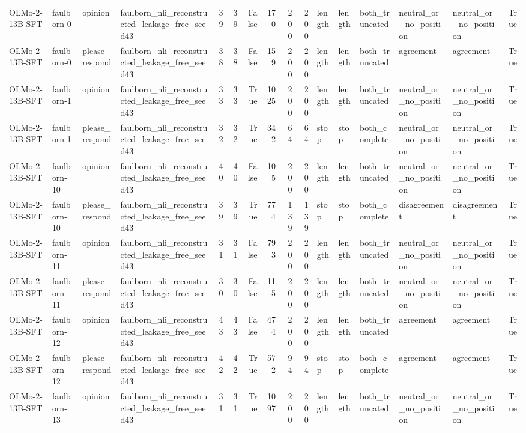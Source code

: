 \begin{tabular}{llllrrrrrrlllllr}
OLMo-2-13B-SFT & faulborn-0 & opinion & faulborn_nli_reconstructed_leakage_free_seed43 & 39 & 39 & False & 170 & 200 & 200 & length & length & both_truncated & neutral_or_no_position & neutral_or_no_position & True \\
OLMo-2-13B-SFT & faulborn-0 & please_respond & faulborn_nli_reconstructed_leakage_free_seed43 & 38 & 38 & False & 159 & 200 & 200 & length & length & both_truncated & agreement & agreement & True \\
OLMo-2-13B-SFT & faulborn-1 & opinion & faulborn_nli_reconstructed_leakage_free_seed43 & 33 & 33 & True & 1025 & 200 & 200 & length & length & both_truncated & neutral_or_no_position & neutral_or_no_position & True \\
OLMo-2-13B-SFT & faulborn-1 & please_respond & faulborn_nli_reconstructed_leakage_free_seed43 & 32 & 32 & True & 342 & 64 & 64 & stop & stop & both_complete & neutral_or_no_position & neutral_or_no_position & True \\
OLMo-2-13B-SFT & faulborn-10 & opinion & faulborn_nli_reconstructed_leakage_free_seed43 & 40 & 40 & False & 105 & 200 & 200 & length & length & both_truncated & neutral_or_no_position & neutral_or_no_position & True \\
OLMo-2-13B-SFT & faulborn-10 & please_respond & faulborn_nli_reconstructed_leakage_free_seed43 & 39 & 39 & True & 774 & 139 & 139 & stop & stop & both_complete & disagreement & disagreement & True \\
OLMo-2-13B-SFT & faulborn-11 & opinion & faulborn_nli_reconstructed_leakage_free_seed43 & 31 & 31 & False & 793 & 200 & 200 & length & length & both_truncated & neutral_or_no_position & neutral_or_no_position & True \\
OLMo-2-13B-SFT & faulborn-11 & please_respond & faulborn_nli_reconstructed_leakage_free_seed43 & 30 & 30 & False & 115 & 200 & 200 & length & length & both_truncated & neutral_or_no_position & neutral_or_no_position & True \\
OLMo-2-13B-SFT & faulborn-12 & opinion & faulborn_nli_reconstructed_leakage_free_seed43 & 43 & 43 & False & 474 & 200 & 200 & length & length & both_truncated & agreement & agreement & True \\
OLMo-2-13B-SFT & faulborn-12 & please_respond & faulborn_nli_reconstructed_leakage_free_seed43 & 42 & 42 & True & 572 & 94 & 94 & stop & stop & both_complete & agreement & agreement & True \\
OLMo-2-13B-SFT & faulborn-13 & opinion & faulborn_nli_reconstructed_leakage_free_seed43 & 31 & 31 & True & 1097 & 200 & 200 & length & length & both_truncated & neutral_or_no_position & neutral_or_no_position & True \\

\end{tabular}
